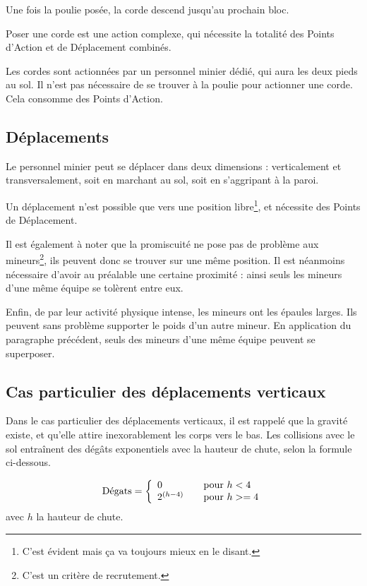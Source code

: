 Une fois la poulie posée, la corde descend jusqu'au prochain bloc.

Poser une corde est une action complexe, qui nécessite la totalité des Points d'Action et de Déplacement combinés.

Les cordes sont actionnées par un personnel minier dédié, qui aura les deux pieds au sol. Il n'est pas nécessaire de se trouver à la poulie pour actionner une corde. Cela consomme des Points d'Action.

\subsection{Déplacements}
Le personnel minier peut se déplacer dans deux dimensions : verticalement et transversalement, soit en marchant au sol, soit en s'aggripant à la paroi.

Un déplacement n'est possible que vers une position libre\footnote{C'est évident mais ça va toujours mieux en le disant.}, et nécessite des Points de Déplacement.

Il est également à noter que la promiscuité ne pose pas de problème aux mineurs\footnote{C'est un critère de recrutement.}, ils peuvent donc se trouver sur une même position. Il est néanmoins nécessaire d'avoir au préalable une certaine proximité : ainsi seuls les mineurs d'une même équipe se tolèrent entre eux.

Enfin, de par leur activité physique intense, les mineurs ont les épaules larges. Ils peuvent sans problème supporter le poids d'un autre mineur. En application du paragraphe précédent, seuls des mineurs d'une même équipe peuvent se superposer.

\subsection{Cas particulier des déplacements verticaux}
Dans le cas particulier des déplacements verticaux, il est rappelé que la gravité existe, et qu'elle attire inexorablement les corps vers le bas. Les collisions avec le sol entraînent des dégâts exponentiels avec la hauteur de chute, selon la formule ci-dessous.

\[
\text{Dégats} = 
\left\{
        \begin{array}{l l}
        0 & \quad \text{pour $h < 4$}\\
        2^{(h-4)} & \quad \text{pour $h >= 4$}\\
        \end{array}
\right. \]
avec $h$ la hauteur de chute.

